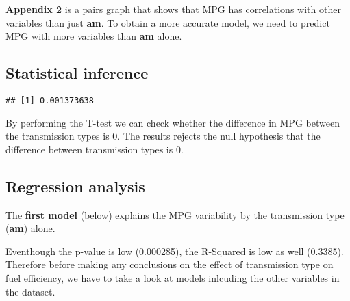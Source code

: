 \documentclass[]{article}
\newenvironment{Shaded}{\begin{snugshade}}{\end{snugshade}}
\newcommand{\KeywordTok}[1]{\textcolor[rgb]{0.13,0.29,0.53}{\textbf{#1}}}
\newcommand{\StringTok}[1]{\textcolor[rgb]{0.31,0.60,0.02}{#1}}
\newcommand{\OperatorTok}[1]{\textcolor[rgb]{0.81,0.36,0.00}{\textbf{#1}}}
\newcommand{\NormalTok}[1]{#1}
\begin{document}
\textbf{Appendix 2} is a pairs graph that shows that MPG has
correlations with other variables than just \textbf{am}. To obtain a
more accurate model, we need to predict MPG with more variables than
\textbf{am} alone.

\subsection{Statistical inference}\label{statistical-inference}

\begin{Shaded}
\end{Shaded}

\begin{verbatim}
## [1] 0.001373638
\end{verbatim}

By performing the T-test we can check whether the difference in MPG
between the transmission types is 0. The results rejects the null
hypothesis that the difference between transmission types is 0.

\subsection{Regression analysis}\label{regression-analysis}

The \textbf{first model} (below) explains the MPG variability by the
transmission type (\textbf{am}) alone.

\begin{Shaded}
\end{Shaded}

Eventhough the p-value is low (0.000285), the R-Squared is low as well
(0.3385). Therefore before making any conclusions on the effect of
transmission type on fuel efficiency, we have to take a look at models
inlcuding the other variables in the dataset.
\end{document}
